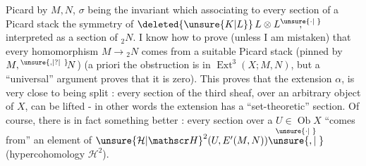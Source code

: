 Picard   by $M,N$, $\sigma$ being the invariant which  associating to every section  of a Picard stack the symmetry of $\deleted{\unsure{K|L}}\,L\otimes L\overset{\unsure{\cdot|\phantom{\cdot}}}{,}$ interpreted as a section of ${}_{2}N$. I know how to prove (unless I am mistaken) that every homomorphism $M\to{}_{2}N$ comes from a suitable Picard stack (pinned by $M,{}^{\unsure{\text{,}|?|\phantom{?}}}\!N$) (a priori the obstruction is in $\operatorname{Ext}^{3}(X;M,N)$, but a ``universal'' argument proves that it is zero). This proves that the extension $\alpha$, is very close to being split : every section of the third sheaf, over an arbitrary object of $X$, can be lifted - in other words the extension has a ``set-theoretic'' section. Of course, there is in fact something better : every section over a $U\in\operatorname{Ob}X$ ``comes from'' an element of ${\unsure{\mathcal H|\mathscr H}}^{2}(U,E'(M,N))\overset{\unsure{\cdot|\phantom{\cdot}}}{\unsure{,|\phantom{,}}}$ (hypercohomology $\mathcal H^{2}$).
